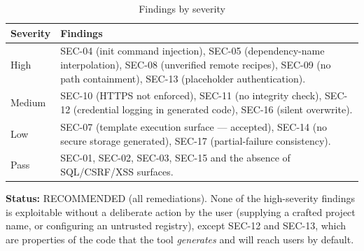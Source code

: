 \begin{table}[H]
\centering
\caption{Findings by severity}
\begin{tabular}{p{2.6cm}p{11.6cm}}
\toprule
\textbf{Severity} & \textbf{Findings} \\
\midrule
High & SEC-04 (init command injection), SEC-05 (dependency-name interpolation),
SEC-08 (unverified remote recipes), SEC-09 (no path containment), SEC-13 (placeholder
authentication). \\
Medium & SEC-10 (HTTPS not enforced), SEC-11 (no integrity check), SEC-12
(credential logging in generated code), SEC-16 (silent overwrite). \\
Low & SEC-07 (template execution surface --- accepted), SEC-14 (no secure storage
generated), SEC-17 (partial-failure consistency). \\
Pass & SEC-01, SEC-02, SEC-03, SEC-15 and the absence of SQL/CSRF/XSS surfaces. \\
\bottomrule
\end{tabular}
\end{table}

\textbf{Status:} RECOMMENDED (all remediations). None of the high-severity findings
is exploitable without a deliberate action by the user (supplying a crafted project
name, or configuring an untrusted registry), except SEC-12 and SEC-13, which are
properties of the code that the tool \emph{generates} and will reach users by
default.
